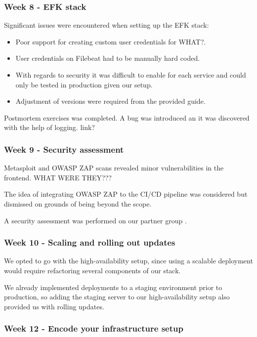 \documentclass{article}
\begin{document}
\subsubsection{Week 8 - EFK stack}

Significant issues were encountered when setting up the EFK stack:

\begin{itemize}
    \item Poor support for creating custom user credentials for WHAT?.
    \item User credentials on Filebeat had to be manually hard coded.
    \item With regards to security it was difficult to enable for each service and could only be tested in production given our setup. 
    \item Adjustment of versions were required from the provided guide. 
\end{itemize}

Postmortem exercises was completed. A bug was introduced an it was discovered with the help of logging. link?

\subsubsection{Week 9 - Security  assessment}

Metasploit and OWASP ZAP scans revealed minor vulnerabilities in the frontend. WHAT WERE THEY???

The idea of integrating OWASP ZAP to the CI/CD pipeline was considered but dismissed on grounds of being beyond the scope.

A security assessment was performed on our partner group \label{appendix:security assessment}. 


\subsubsection{Week 10 - Scaling and rolling out updates }

We opted to go with the high-availability setup, since using a scalable deployment would require refactoring several components of our stack.

We already implemented deployments to a staging environment prior to production, so adding the staging server to our high-availability setup also provided us with rolling updates.  

\subsubsection{Week 12 - Encode your infrastructure setup }
\end{document}
